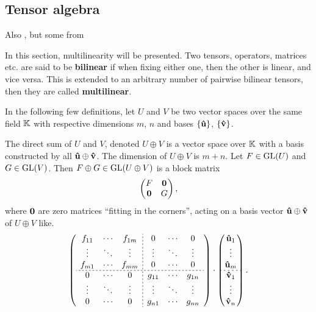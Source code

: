 	\subsection{Tensor algebra}
	
	Also \cite{Jeevanjee}, but some from \cite{holst}
	
	In this section, multilinearity will be presented. Two tensors, operators, matrices etc. are said to be \textbf{bilinear} if when fixing either one, then the other is linear, and vice versa. This is extended to an arbitrary number of pairwise bilinear tensors, then they are called \textbf{multilinear}.
	
	In the following few definitions, let $U$ and $V$ be two vector spaces over the same field $\mathbb{K}$ with respective dimensions $m$, $n$ and bases $\{\mathbf{\hat{u}}\}$, $\{\mathbf{\hat{v}}\}$.
	
	\begin{definition}
		The direct sum of $U$ and $V$, denoted $U \oplus V$ is a vector space over $\mathbb{K}$ with a basis constructed by all $\mathbf{\hat{u}} \oplus \mathbf{\hat{v}}$. The dimension of $U \oplus V$ is $m+n$. Let $F \in \text{GL}(U)$ and $G \in \text{GL}(V)$. Then $F \oplus G \in \text{GL}(U \oplus V)$ is a block matrix
		\begin{align}
			\begin{pmatrix}
				F & \mathbf{0} \\
				\mathbf{0} & G
			\end{pmatrix},
		\end{align}
		where $\mathbf{0}$ are zero matrices ``fitting in the corners'', acting on a basis vector $\mathbf{\hat{u}} \oplus \mathbf{\hat{v}}$ of $U \oplus V$ like.
		\begin{align}
			\left(
			\begin{array}{ccc;{2pt/2pt}ccc}
				f_{11}                    & \cdots & f_{1m} & 0      & \cdots & 0      \\
				\vdots                    & \ddots & \vdots & \vdots & \ddots & \vdots \\
				f_{m1}                    & \cdots & f_{mm} & 0      & \cdots & 0      \\
				\hdashline[2pt/2pt]
				0 & \cdots & 0      & g_{11} & \cdots & g_{1n} \\
				\vdots                    & \ddots & \vdots & \vdots & \ddots & \vdots \\
				0                         & \cdots & 0      & g_{n1} & \cdots & g_{nn}
			\end{array}
			\right)\cdot
			\begin{pmatrix}
				\uhat_1                         \\
				\vdots                          \\
				\uhat_{m}                       \\
				\hdashline[2pt/2pt]
				\vhat_1 \\
				\vdots                          \\
				\vhat_{n}
			\end{pmatrix}.
		\end{align}
	\end{definition}
	
